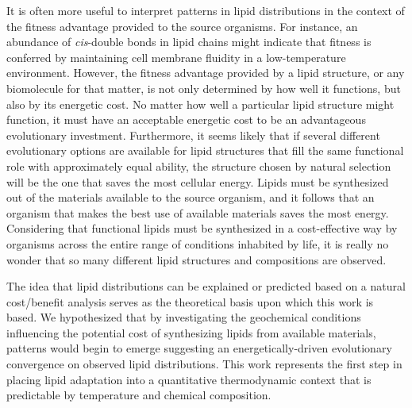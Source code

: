 It is often more useful to interpret patterns in lipid distributions in the context of the fitness advantage provided to the source organisms. For instance, an abundance of \textit{cis}-double bonds in lipid chains might indicate that fitness is conferred by maintaining cell membrane fluidity in a low-temperature environment. However, the fitness advantage provided by a lipid structure, or any biomolecule for that matter, is not only determined by how well it functions, but also by its energetic cost. No matter how well a particular lipid structure might function, it must have an acceptable energetic cost to be an advantageous evolutionary investment. Furthermore, it seems likely that if several different evolutionary options are available for lipid structures that fill the same functional role with approximately equal ability, the structure chosen by natural selection will be the one that saves the most cellular energy. Lipids must be synthesized out of the materials available to the source organism, and it follows that an organism that makes the best use of available materials saves the most energy. Considering that functional lipids must be synthesized in a cost-effective way by organisms across the entire range of conditions inhabited by life, it is really no wonder that so many different lipid structures and compositions are observed. 

The idea that lipid distributions can be explained or predicted based on a natural cost/benefit analysis serves as the theoretical basis upon which this work is based. We hypothesized that by investigating the geochemical conditions influencing the potential cost of synthesizing lipids from available materials, patterns would begin to emerge suggesting an energetically-driven evolutionary convergence on observed lipid distributions. This work represents the first step in placing lipid adaptation into a quantitative thermodynamic context that is predictable by temperature and chemical composition.

